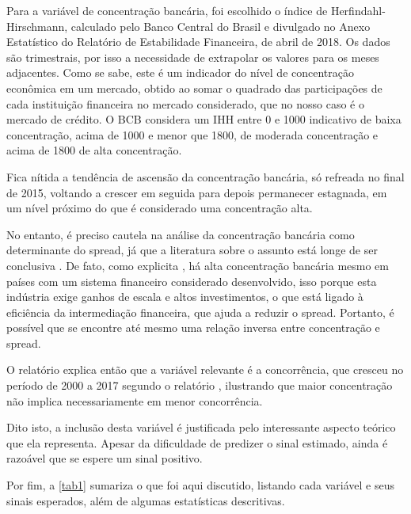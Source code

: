 \documentclass[a4paper, article, 12pt, openany, oneside, english, brazil]{abntex2}
\begin{document}
    Para a variável de concentração bancária, foi escolhido o índice de Herfindahl-Hirschmann, calculado pelo Banco Central do Brasil e divulgado no Anexo Estatístico do Relatório de Estabilidade Financeira, de abril de 2018. Os dados são trimestrais, por isso a necessidade de extrapolar os valores para os meses adjacentes. Como se sabe, este é um indicador do nível de concentração econômica em um mercado, obtido ao somar o quadrado das participações de cada instituição financeira no mercado considerado, que no nosso caso é o mercado de crédito. O BCB considera um IHH entre 0 e 1000 indicativo de baixa concentração, acima de 1000 e menor que 1800, de moderada concentração e acima de 1800 de alta concentração.

    Fica nítida a tendência de ascensão da concentração bancária, só refreada no final de 2015, voltando a crescer em seguida para depois permanecer estagnada, em um nível próximo do que é considerado uma concentração alta.

    No entanto, é preciso cautela na análise da concentração bancária como determinante do spread, já que a literatura sobre o assunto está longe de ser conclusiva \cite[p.~11]{reb2017}. De fato, como explicita , há alta concentração bancária mesmo em países com um sistema financeiro considerado desenvolvido, isso porque esta indústria exige ganhos de escala e altos investimentos, o que está ligado à eficiência da intermediação financeira, que ajuda a reduzir o spread. Portanto, é possível que se encontre até mesmo uma relação inversa entre concentração e spread. 

    O relatório explica então que a variável relevante é a concorrência, que cresceu no período de 2000 a 2017 segundo o relatório \cite[p.~11]{reb2017}, ilustrando que maior concentração não implica necessariamente em menor concorrência.

    Dito isto, a inclusão desta variável é justificada pelo interessante aspecto teórico que ela representa. Apesar da dificuldade de predizer o sinal estimado, ainda é razoável que se espere um sinal positivo.

    Por fim, a \autoref{tab1} sumariza o que foi aqui discutido, listando cada variável e seus sinais esperados, além de algumas estatísticas descritivas.
\end{document}
